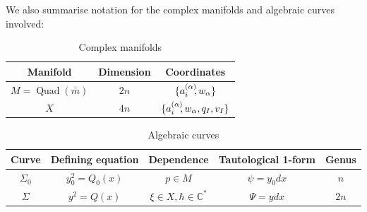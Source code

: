 \documentclass[a4paper,12pt,reqno]{amsart}
\numberwithin{equation}{section}
\numberwithin{counter2}{section}
\begin{document}
We also summarise notation for the complex manifolds and algebraic curves involved:
\normalsize
\begin{table}[h]
\caption{Complex manifolds}
\centering
\begin{tabular}{|c|c|c|}
\hline
Manifold & Dimension & Coordinates \\
\hline 
$M = \operatorname{Quad}(\bar{m})$ & $2n$ & $\{a_{i}^{(\alpha)}\hspace{-1mm},w_\alpha\}$ \\
$X$ & $4n$ & $\{a_{i}^{(\alpha)}\hspace{-1mm},w_\alpha,  q_I,  v_I\}$  \\
\hline
\end{tabular}
\end{table} 
\begin{table}[h]
\caption{Algebraic curves}
\centering
\begin{tabular}{|c|c|c|c|c|}
\hline
Curve & Defining equation & Dependence & Tautological 1-form & Genus \\
\hline 
$\Sigma_0$ & $y_0^2 = Q_0(x)$ & $p \in M$ & $\psi = y_0 dx$ & $n$   \\
$\Sigma$ & $y^2 = Q(x)$ & $\xi \in X,  \hbar \in \mathbb{C}^*$ & $\Psi = y dx$ & $2n$  \\
\hline
\end{tabular}
\end{table} 
\normalsize
\end{document}
